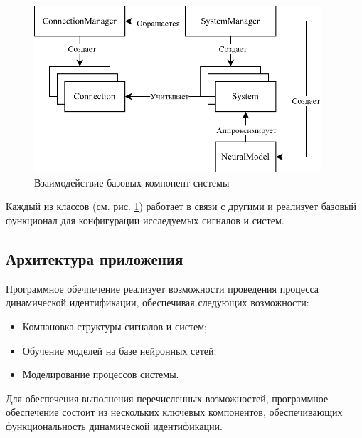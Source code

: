 \begin{figure}[H]
  \begin{center}
    \includegraphics[width=0.95\textwidth]{figures/basics_relations.png}
  \end{center}
  \caption{Взаимодействие базовых компонент системы}\label{fig:basics:components}
\end{figure}

Каждый из классов (см. рис. \ref{fig:basics:components}) работает в связи с
другими и реализует базовый функционал для конфигурации исследуемых сигналов и
систем.

\subsection{Архитектура приложения}

Программное обечпечение реализует возможности проведения процесса динамической
идентификации, обеспечивая следующих возможности:
\begin{itemize}
  \item Компановка структуры сигналов и систем;
  \item Обучение моделей на базе нейронных сетей;
  \item Моделирование процессов системы.
\end{itemize}

Для обеспечения выполнения перечисленных возможностей, программное обеспечение
состоит из нескольких ключевых компонентов, обеспечивающих функциональность
динамической идентификации. 


